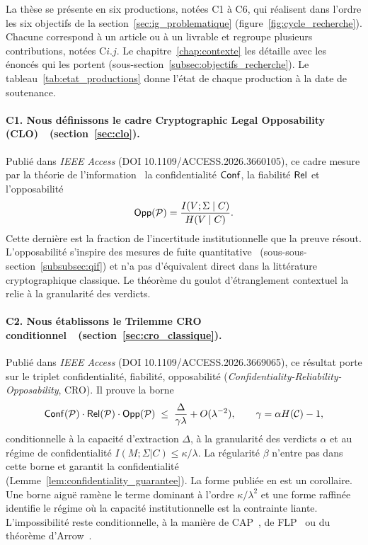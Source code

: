\begin{sloppypar}
La th\`ese se pr\'esente en six productions, not\'ees C1 \`a C6, qui r\'ealisent dans l'ordre les six objectifs de la section~\ref{sec:ig_problematique} (figure~\ref{fig:cycle_recherche}). Chacune correspond \`a un article ou \`a un livrable et regroupe plusieurs contributions, not\'ees C$i$.$j$. Le chapitre~\ref{chap:contexte} les d\'etaille avec les \'enonc\'es qui les portent (sous-section~\ref{subsec:objectifs_recherche}). Le tableau~\ref{tab:etat_productions} donne l'\'etat de chaque production \`a la date de soutenance.

\paragraph{C1. Nous d\'efinissons le cadre Cryptographic Legal Opposability (CLO)~\cite{MINKA2026CLO}~(section~\ref{sec:clo}).}
Publi\'e dans \emph{IEEE Access} (DOI 10.1109/ACCESS.2026.3660105), ce cadre mesure par la th\'eorie de l'information~\cite{Shannon48,CoverThomas06} la confidentialit\'e $\mathsf{Conf}$, la fiabilit\'e $\mathsf{Rel}$ et l'opposabilit\'e
\begin{equation}
  \mathsf{Opp}(\mathcal{P}) = \frac{I(V;\Sigma \mid C)}{H(V \mid C)}.
\end{equation}
Cette derni\`ere est la fraction de l'incertitude institutionnelle que la preuve r\'esout. L'opposabilit\'e s'inspire des mesures de fuite quantitative~\cite{Smith09,Alvim12} (sous-sous-section~\ref{subsubsec:qif}) et n'a pas d'\'equivalent direct dans la litt\'erature cryptographique classique. Le th\'eor\`eme du goulot d'\'etranglement contextuel la relie \`a la granularit\'e des verdicts.

\paragraph{C2. Nous \'etablissons le Trilemme CRO conditionnel~\cite{MINKA2026CRO}~(section~\ref{sec:cro_classique}).}
Publi\'e dans \emph{IEEE Access} (DOI 10.1109/ACCESS.2026.3669065), ce r\'esultat porte sur le triplet confidentialit\'e, fiabilit\'e, opposabilit\'e (\emph{Confidentiality-Reliability-Opposability}, CRO). Il prouve la borne
\begin{equation}
  \mathsf{Conf}(\mathcal{P})\cdot\mathsf{Rel}(\mathcal{P})\cdot\mathsf{Opp}(\mathcal{P})
  \;\leq\;
  \frac{\Delta}{\gamma\lambda} + O(\lambda^{-2}),
  \qquad \gamma = \alpha H(\mathcal{C}) - 1,
\end{equation}
conditionnelle \`a la capacit\'e d'extraction $\Delta$, \`a la granularit\'e des verdicts $\alpha$ et au r\'egime de confidentialit\'e $I(M;\Sigma|C) \leq \kappa/\lambda$. La r\'egularit\'e $\beta$ n'entre pas dans cette borne et garantit la confidentialit\'e (Lemme~\ref{lem:confidentiality_guarantee}). La forme publi\'ee en est un corollaire. Une borne aigu\"e ram\`ene le terme dominant \`a l'ordre $\kappa/\lambda^2$ et une forme raffin\'ee identifie le r\'egime o\`u la capacit\'e institutionnelle est la contrainte liante. L'impossibilit\'e reste conditionnelle, \`a la mani\`ere de CAP~\cite{Brewer00,GilbertLynch02}, de FLP~\cite{FLP85} ou du th\'eor\`eme d'Arrow~\cite{Arrow50}.


\end{sloppypar}
